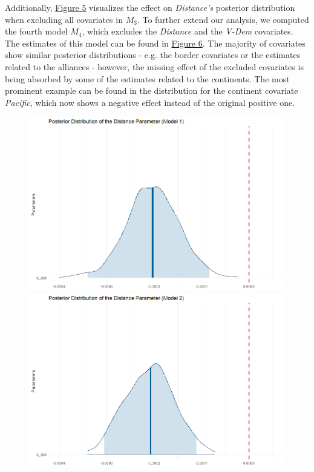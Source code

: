 \documentclass[12pt,a4paper]{article}
\begin{document}
\clearpage
Additionally, \hyperref[F:5]{\color{blue}Figure 5} visualizes the effect on \textit{Distance's} posterior distribution when excluding all covariates in $M_3$. To further extend our analysis, we computed the fourth model $M_4$, which excludes the \textit{Distance} and the \textit{V-Dem} covariates. The estimates of this model can be found in \hyperref[F:6]{\color{blue}Figure 6}. The majority of covariates show similar posterior distributions - e.g. the border covariates or the estimates related to the alliances - however, the missing effect of the excluded covariates is being absorbed by some of the estimates related to the continents. The most prominent example can be found in the distribution for the continent covariate \textit{Pacific}, which now shows a negative effect instead of the original positive one.
\begin{figure}[h]
\center
\label{F:5}
\includegraphics[scale=0.2]{PosteriorPlot_Distance_Model1.png}
\includegraphics[scale=0.2]{PosteriorPlot_Distance_Model2.png}

\end{figure}
\end{document}
